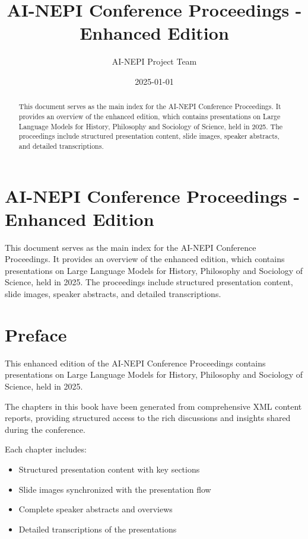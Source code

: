 \documentclass[
  letterpaper,
]{book}
\title{AI-NEPI Conference Proceedings - Enhanced Edition}
\author{AI-NEPI Project Team}
\date{2025-01-01}
\providecommand{\tightlist}{%
  \setlength{\itemsep}{0pt}\setlength{\parskip}{0pt}}
\renewcommand*\contentsname{Table of contents}
\newcommand\contentsname{Table of contents}
\begin{document}
\frontmatter
\maketitle
\begin{abstract}
This document serves as the main index for the AI-NEPI Conference
Proceedings. It provides an overview of the enhanced edition, which
contains presentations on Large Language Models for History, Philosophy
and Sociology of Science, held in 2025. The proceedings include
structured presentation content, slide images, speaker abstracts, and
detailed transcriptions.
\end{abstract}

\renewcommand*\contentsname{Table of contents}
{
\setcounter{tocdepth}{2}
\tableofcontents
}

\mainmatter
{}

\chapter{AI-NEPI Conference Proceedings - Enhanced
Edition}\label{ai-nepi-conference-proceedings---enhanced-edition}

This document serves as the main index for the AI-NEPI Conference
Proceedings. It provides an overview of the enhanced edition, which
contains presentations on Large Language Models for History, Philosophy
and Sociology of Science, held in 2025. The proceedings include
structured presentation content, slide images, speaker abstracts, and
detailed transcriptions.

\hfill\break


\chapter{Preface}\label{preface}

This enhanced edition of the AI-NEPI Conference Proceedings contains
presentations on Large Language Models for History, Philosophy and
Sociology of Science, held in 2025.

The chapters in this book have been generated from comprehensive XML
content reports, providing structured access to the rich discussions and
insights shared during the conference.

Each chapter includes:

\begin{itemize}
\tightlist
\item
  Structured presentation content with key sections
\item
  Slide images synchronized with the presentation flow\\
\item
  Complete speaker abstracts and overviews
\item
  Detailed transcriptions of the presentations
\end{itemize}
\end{document}
